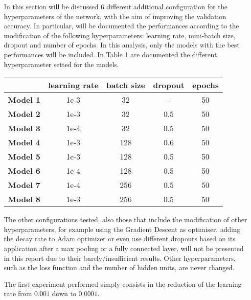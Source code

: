 \documentclass[a4paper,12pt]{article} %
\begin{document}
	In this section will be discussed $6$ different additional configuration 
	for the hyperparameters of the network, with the aim of improving the 
	validation accuracy. In particular, will be documented the performances 
	according to the modification of the following hyperparameters: learning 
	rate, mini-batch size, dropout and number of epochs. In this analysis, only 
	the models with the best performances will be included. In Table 
	\ref{tab:param1} are documented the different hyperparameter setted for the 
	models. 
	
	\begin{table}[htb]
		\centering
		\begin{tabular}{l@{\hspace{.5cm}}cccc}
			\toprule
			& \textbf{learning rate} & \textbf{batch size} & \textbf{dropout} & 
			\textbf{epochs} \\
			\midrule
			\textbf{Model 1}  & {1e-3} & {32}  &  -  & 50\\
			\textbf{Model 2}  & {1e-3} & {32}  & 0.5 & 50\\
			\textbf{Model 3}  & {1e-4} & {32}  & 0.5 & 50 \\
			\textbf{Model 4}  & {1e-3} & {128} & 0.6 & 50 \\
			\textbf{Model 5}  & {1e-3} & {128} & 0.5 & 50 \\
			\textbf{Model 6} & {1e-4} & {128} & 0.5 & 50 \\
			\textbf{Model 7}  & {1e-4} & {256} & 0.5 & 50 \\
			\textbf{Model 8}  & {1e-3} & {256} & 0.5 & 50 \\
			\bottomrule 
		\end{tabular}
		\label{tab:param1}
	\end{table}

	The other configurations tested, also those that include the modification 
	of other hyperparameters, for example using the Gradient Descent as 
	optimiser, adding the decay rate to Adam optimizer or even use different 
	dropouts based on its application after a max pooling or a fully connected 
	layer, will not be presented in this report due to their 
	barely/insufficient results. Other hyperparameters, such as the loss 
	function and the number of hidden units, are never changed. 
	\newline

	The first experiment performed simply consists in the reduction of the 
	learning rate from $0.001$ down to $0.0001$. 
	
\end{document}
